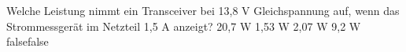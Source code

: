     {Welche Leistung nimmt ein Transceiver bei 13,8 V Gleichspannung auf, wenn das Strommessgerät im Netzteil 1,5 A anzeigt?}
    {20,7 W}
    {1,53 W}
    {2,07 W}
    {9,2 W}
    {false}{false}